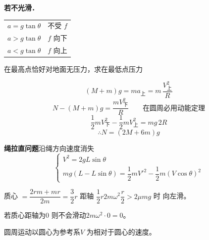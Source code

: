 \textbf{若不光滑．}
\begin{center}
\begin{tabular}{@{}ll@{}}
$a=g\tan\theta$ & 不受 $f$\\
$a>g\tan\theta$ & $f$ 向下\\
$a<g\tan\theta$ & $f$ 向上\\
\end{tabular}
\end{center}
\begin{problem}
在最高点恰好对地面无压力，求在最低点压力
\begin{solution}
\[ (M+m)g=ma_{\text{上}}=m\,\frac{V_{\text{上}}^2}{R} \]
\[ N-(M+m)g=\frac{mV_{\text{下}}^2}{R}\qquad \text{在圆周必用动能定理} \]
\[ \frac12mV_{\text{下}}^2-\frac12mV_{\text{上}}^2=mg\,2R \]
\[ \therefore N=(2M+6m)g \]
\end{solution}
\end{problem}
\noindent \textbf{绳拉直问题}\quad 沿绳方向速度消失
\[ \begin{cases} V^2=2gL\sin\theta\\ mg(L-L\sin\theta)=\dfrac12mV'^2-\dfrac12m(V\cos\theta)^2\end{cases} \]
\begin{problem}
\begin{solution}
质心 $=\dfrac{2rm+mr}{2m}=\dfrac32r$ 距轴 $\dfrac12r$\qquad $2m\omega^2\dfrac r2>2\mu mg$ 时 向左滑。

若质心距轴为0 则不会滑动\qquad $2m\omega^2\cdot0=0$。
\end{solution}
\end{problem}
\noindent 圆周运动以圆心为参考系\qquad $V$ 为相对于圆心的速度。
